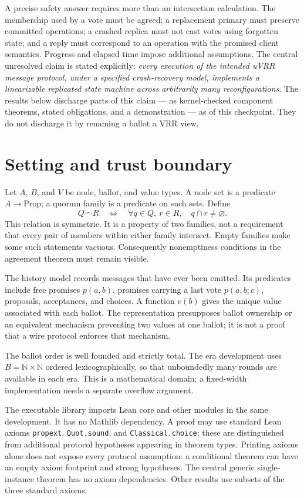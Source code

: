 \documentclass[10pt,journal,letterpaper]{IEEEtran}
\newcommand{\inter}{\mathrel{\frown}}
\newcommand{\code}[1]{\texttt{\small #1}}
\begin{document}
A precise safety answer requires more than an intersection calculation. The
membership used by a vote must be agreed; a replacement primary must preserve
committed operations; a crashed replica must not cast votes using forgotten
state; and a reply must correspond to an operation with the promised client
semantics. Progress and elapsed time impose additional assumptions. The
central unresolved claim is stated explicitly: \emph{every execution of the
intended uVRR message protocol, under a specified crash-recovery model,
implements a linearizable replicated state machine across arbitrarily many
reconfigurations}. The results below discharge parts of this claim --- as
kernel-checked component theorems, stated obligations, and a demonstration ---
as of this checkpoint. They do not discharge it by renaming a ballot a VRR
view.

\section{Setting and trust boundary}
Let $A$, $B$, and $V$ be node, ballot, and value types. A node set is a
predicate $A\to\mathrm{Prop}$; a quorum family is a predicate on such sets.
Define
\[
 Q\inter R\quad\Longleftrightarrow\quad
\forall q\in Q,\ r\in R,\quad q\cap r\ne\varnothing.
\]
This relation is symmetric. It is a property of two families, not a requirement
that every pair of members within either family intersect. Empty families
make some such statements vacuous. Consequently nonemptiness conditions in
the agreement theorem must remain visible.

The history model records messages that have ever been emitted. Its predicates
include free promises $p(a,b)$, promises carrying a last vote $p(a,b;c)$,
proposals, acceptances, and choices. A function $v(b)$ gives the unique value
associated with each ballot. The representation presupposes ballot ownership
or an equivalent mechanism preventing two values at one ballot; it is not a
proof that a wire protocol enforces that mechanism.

The ballot order is well founded and strictly total. The era development uses
$B=\mathbb N\times\mathbb N$ ordered lexicographically, so that unboundedly
many rounds are available in each era. This is a mathematical domain; a
fixed-width implementation needs a separate overflow argument.

The executable library imports Lean core and other modules in the same
development. It has no Mathlib dependency. A proof may use standard Lean
axioms \code{propext}, \code{Quot.sound}, and \code{Classical.choice}; these
are distinguished from additional protocol hypotheses appearing in theorem
types. Printing axioms alone does not expose every protocol assumption: a
conditional theorem can have an empty axiom footprint and strong hypotheses.
The central generic single-instance theorem has no axiom dependencies. Other
results use subsets of the three standard axioms.
\end{document}
